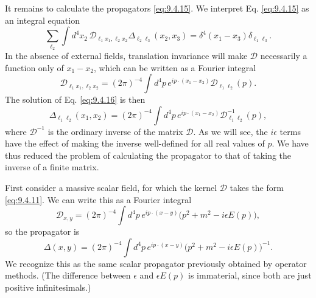 It remains to calculate the propagators \eqref{eq:9.4.15}. We interpret Eq. \eqref{eq:9.4.15} as
an integral equation
\begin{equation}
\sum_{\ell_2}\int d^4x_2\,
 \mathcal D_{\ell_1x_1,\ell_2x_2}
 \Delta_{\ell_2\ell_3}(x_2,x_3)
=\delta^4(x_1-x_3)\delta_{\ell_1\ell_3}.
\tag{9.4.16}\label{eq:9.4.16}
\end{equation}
In the absence of external fields, translation invariance will make
$\mathcal D$ necessarily a function only of $x_1-x_2$, which can be written as
a Fourier integral
\begin{equation}
\mathcal D_{\ell_1x_1,\ell_2x_2}
=(2\pi)^{-4}\int d^4p\,e^{ip\cdot(x_1-x_2)}
 \mathcal D_{\ell_1\ell_2}(p).
\tag{9.4.17}\label{eq:9.4.17}
\end{equation}
The solution of Eq. \eqref{eq:9.4.16} is then
\begin{equation}
\Delta_{\ell_1\ell_2}(x_1,x_2)
=(2\pi)^{-4}\int d^4p\,e^{ip\cdot(x_1-x_2)}
 \mathcal D^{-1}_{\ell_1\ell_2}(p),
\tag{9.4.18}\label{eq:9.4.18}
\end{equation}
where $\mathcal D^{-1}$ is the ordinary inverse of the matrix $\mathcal D$.
As we will see, the $i\epsilon$ terms have the effect of making the inverse
well-defined for all real values of $p$. We have thus reduced the problem of
calculating the propagator to that of taking the inverse of a finite matrix.

First consider a massive scalar field, for which the kernel $\mathcal D$ takes
the form \eqref{eq:9.4.11}. We can write this as a Fourier integral
\[
\mathcal D_{x,y}=(2\pi)^{-4}\int d^4p\,e^{ip\cdot(x-y)}
 \bigl(p^2+m^2-i\epsilon E(p)\bigr),
\]
so the propagator is
\[
\Delta(x,y)=(2\pi)^{-4}\int d^4p\,e^{ip\cdot(x-y)}
 \bigl(p^2+m^2-i\epsilon E(p)\bigr)^{-1}.
\]
We recognize this as the same scalar propagator previously obtained by
operator methods. (The difference between $\epsilon$ and $\epsilon E(p)$ is
immaterial, since both are just positive infinitesimals.)

